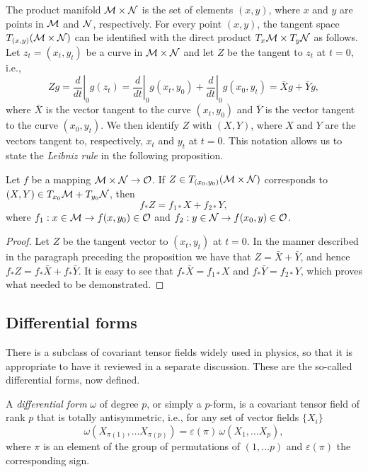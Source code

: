 \documentclass[
final,
11pt,
a4paper,
DIV=11,
headinclude=true,
footinclude=false,
bibliography=totoc,
twoside=true,  %
BCOR=5mm
]{scrbook}
\begin{document}
The product manifold $\mathcal{M} \times \mathcal{N}$ is the set of 
elements $(x,y)$, where $x$ and $y$ are points in $\mathcal{M}$ and 
$\mathcal{N}$, respectively. For every point $(x,y)$, the tangent 
space $T_{(x,y)}(\mathcal{M} \times \mathcal{N})$ can be identified with 
the direct product $T_x\mathcal{M} \times T_y\mathcal{N}$ as follows. Let 
$z_t = (x_t,y_t)$ be a curve in $\mathcal{M} \times \mathcal{N}$ and let 
$Z$ be the tangent to $z_t$ at $t = 0$, i.e.,
\begin{equation*}
  Zg = \left.\frac{d}{dt}\right|_0 g(z_t)
    = \left.\frac{d}{dt}\right|_0 g(x_t,y_0)
      + \left.\frac{d}{dt}\right|_0 g(x_0,y_t)
    = \bar{X}g + \bar{Y}g,
\end{equation*}
where $\bar{X}$ is the vector tangent to the curve 
$(x_t,y_0)$ and $\bar{Y}$ is the vector tangent to the curve 
$(x_0,y_t)$. We then identify $Z$ with $(X,Y)$, where $X$ and 
$Y$ are the vectors tangent to, respectively, $x_t$ and $y_t$ at 
$t = 0$. This notation allows us to state the \emph{Leibniz 
  rule} in the following proposition.

\begin{proposition}
\label{prop:Leibniz}
Let $f$ be a mapping $\mathcal{M} \times \mathcal{N} \to \mathcal{O}$. If $Z \in 
T_{(x_0,y_0)}(\mathcal{M} \times \mathcal{N})$ corresponds to 
$(X,Y) \in T_{x_0}\mathcal{M} + T_{y_0}\mathcal{N}$, then
\begin{equation*}
  f_* Z = f_{1*}X + f_{2*}Y,
\end{equation*}
where $f_1 : x \in \mathcal{M} \to f(x,y_0) \in \mathcal{O}$ and $f_2 : y 
\in \mathcal{N} \to f(x_0,y) \in \mathcal{O}$.
\end{proposition}
\begin{proof}
Let $Z$ be the tangent vector to $(x_t,y_t)$ at $t = 0$. In the 
manner described in the paragraph preceding the proposition we 
have that $Z = \bar{X} + \bar{Y}$, and hence $f_*Z = f_*\bar{X} 
+ f_*\bar{Y}$.  It is easy to see that $f_*\bar{X} = f_{1*}X$ and 
$f_*\bar{Y} = f_{2*}Y$, which proves what needed to be 
demonstrated.
\end{proof}


\subsection{Differential forms}

There is a subclass of covariant tensor fields widely used in 
physics, so that it is appropriate to have it reviewed in a 
separate discussion. These are the so-called differential forms, 
now defined.

\begin{definition}
A \emph{differential form} $\omega$ of degree $p$, or simply a 
$p$-form, is a covariant tensor field of rank $p$ that is totally 
antisymmetric, i.e., for any set of vector fields $\{X_i\}$
\begin{equation*}
  \omega(X_{\pi(1)},\ldots X_{\pi(p)}) = \varepsilon(\pi)\, 
  \omega(X_1,\ldots X_p),
\end{equation*}
where $\pi$ is an element of the group of permutations of 
$(1,\ldots p)$ and $\varepsilon(\pi)$ the corresponding sign.
\end{definition}
\end{document}

